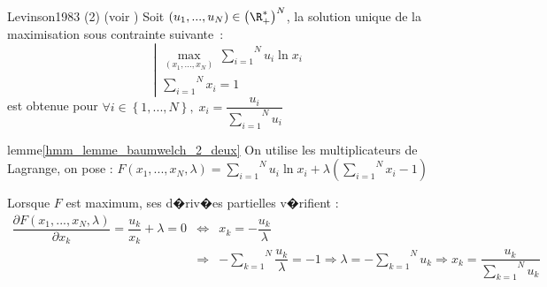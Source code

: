         \begin{xlemma}{Levinson1983 (2)}\label{hmm_lemme_baumwelch_2_deux} (voir )
        Soit $\left(  u_{1},...,u_{N}\right)  \in\left( \R_{+}^{\ast}\right)  ^{N}$, 
        la solution unique de la maximisation sous contrainte suivante~:
                $$
                \left|
                \begin{array}{l}%
                \underset{\left(  x_{1},...,x_{N}\right)  }{\max}\,\overset{N}{\underset
                {i=1}{\sum}}u_{i}\ln x_{i}\\
                \overset{N}{\underset{i=1}{\sum}}x_{i}=1
                \end{array}
                \right.
                $$
        est obtenue pour $\forall i\in\left\{  1,...,N\right\}  ,\; x_{i}=\dfrac{u_{i}}{\overset{N}{\underset{i=1}{\sum}}u_{i}}$
        \end{xlemma}



\begin{xdemo}{lemme}{\ref{hmm_lemme_baumwelch_2_deux}}
On utilise les multiplicateurs de Lagrange, on pose : $F\left(  x_{1} ,...,x_{N},\lambda\right)
=\overset{N}{\underset{i=1}{\sum}}u_{i}\ln x_{i}+\lambda\left(  \overset{N}{\underset{i=1}{\sum}}x_{i}-1\right)  $

Lorsque $F$ est maximum, ses d�riv�es partielles v�rifient :
        \begin{eqnarray*}
        \dfrac{\partial F\left(  x_{1},...,x_{N},\lambda\right)  }{\partial x_{k} }=\dfrac{u_{k}}{x_{k}}+\lambda=0 &\Longleftrightarrow&
            x_{k}=-\dfrac{u_{k} }{\lambda}\\
        &\Longrightarrow& -\overset{N}{\underset{k=1}{\sum}}\dfrac{u_{k}
         }{\lambda}=-1\Longrightarrow\lambda=-\overset{N}{\underset{k=1}{\sum}}
        u_{k}\Longrightarrow x_{k}=\dfrac{u_{k}}{\overset{N}{\underset{k=1}{\sum} }u_{k}}
        \end{eqnarray*}
\end{xdemo}











